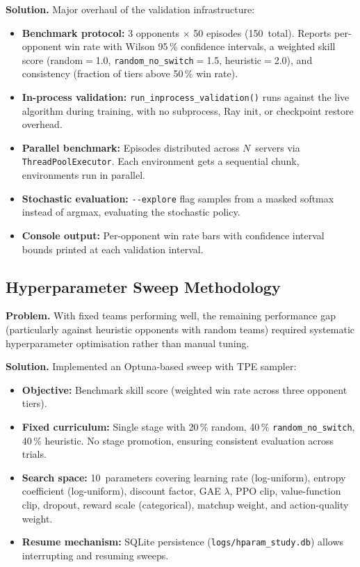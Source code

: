 \textbf{Solution.} Major overhaul of the validation infrastructure:
\begin{itemize}
  \item \textbf{Benchmark protocol:} 3 opponents $\times$ 50 episodes
        (150~total).  Reports per-opponent win rate with Wilson 95\,\%
        confidence intervals, a weighted skill score (random$=$1.0,
        \texttt{random\_no\_switch}$=$1.5, heuristic$=$2.0), and consistency
        (fraction of tiers above 50\,\% win rate).
  \item \textbf{In-process validation:} \texttt{run\_inprocess\_validation()}
        runs against the live algorithm during training, with no subprocess,
        Ray init, or checkpoint restore overhead.
  \item \textbf{Parallel benchmark:} Episodes distributed across $N$~servers
        via \texttt{ThreadPoolExecutor}.  Each environment gets a sequential
        chunk, environments run in parallel.
  \item \textbf{Stochastic evaluation:} \texttt{-{}-explore} flag samples
        from a masked softmax instead of argmax, evaluating the stochastic
        policy.
  \item \textbf{Console output:} Per-opponent win rate bars with confidence
        interval bounds printed at each validation interval.
\end{itemize}

\subsection{Hyperparameter Sweep Methodology}

\textbf{Problem.} With fixed teams performing well, the remaining performance
gap (particularly against heuristic opponents with random teams) required
systematic hyperparameter optimisation rather than manual tuning.

\textbf{Solution.} Implemented an Optuna-based sweep with TPE sampler:
\begin{itemize}
  \item \textbf{Objective:} Benchmark skill score (weighted win rate across
        three opponent tiers).
  \item \textbf{Fixed curriculum:} Single stage with 20\,\% random,
        40\,\% \texttt{random\_no\_switch}, 40\,\% heuristic.  No stage
        promotion, ensuring consistent evaluation across trials.
  \item \textbf{Search space:} 10~parameters covering learning rate
        (log-uniform), entropy coefficient (log-uniform), discount factor,
        GAE $\lambda$, PPO clip, value-function clip, dropout, reward scale
        (categorical), matchup weight, and action-quality weight.
  \item \textbf{Resume mechanism:} SQLite persistence
        (\texttt{logs/hparam\_study.db}) allows interrupting and resuming
        sweeps.
\end{itemize}
